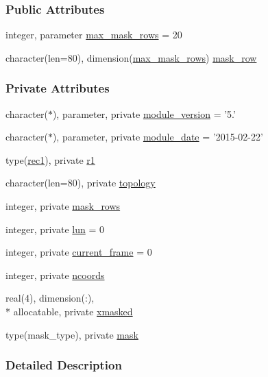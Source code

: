 \subsubsection*{Public Attributes}
\begin{DoxyCompactItemize}
\item 
integer, parameter \hyperlink{classtrj_a82dde4806006cf7789887e849dae4443}{max\-\_\-mask\-\_\-rows} = 20
\item 
character(len=80), dimension(\hyperlink{classtrj_a82dde4806006cf7789887e849dae4443}{max\-\_\-mask\-\_\-rows}) \hyperlink{classtrj_a2e5ed1fb4cc717df7c8a8cd01174d0c1}{mask\-\_\-row}
\end{DoxyCompactItemize}
\subsubsection*{Private Attributes}
\begin{DoxyCompactItemize}
\item 
character($\ast$), parameter, private \hyperlink{classtrj_a2865e4831781f2cf03f656976cdf17e0}{module\-\_\-version} = '5.'
\item 
character($\ast$), parameter, private \hyperlink{classtrj_a1ad7018116ab14c2fd3f3fde2792055d}{module\-\_\-date} = '2015-\/02-\/22'
\item 
type(\hyperlink{structtrj_1_1rec1}{rec1}), private \hyperlink{classtrj_acf470327c3f403618e7baa2a0ea78d67}{r1}
\item 
character(len=80), private \hyperlink{classtrj_a4c4bd9f146c2196f65befad1b0de347c}{topology}
\item 
integer, private \hyperlink{classtrj_a7c93922f84f1c169722dd8f2d0417f58}{mask\-\_\-rows}
\item 
integer, private \hyperlink{classtrj_a0b2ab5229b0662496be10cd030269061}{lun} = 0
\item 
integer, private \hyperlink{classtrj_a2b6c4bc77aab36d66d49c40d0eb6bfa3}{current\-\_\-frame} = 0
\item 
integer, private \hyperlink{classtrj_aff4c766e3802d44c4064fe02cc46c5c7}{ncoords}
\item 
real(4), dimension(\-:), \\*
allocatable, private \hyperlink{classtrj_a2f46430a700e35ee26d619ce6d99dfd3}{xmasked}
\item 
type(mask\-\_\-type), private \hyperlink{classtrj_ab48e8fc72f4100008d1e4eb7ca8e6101}{mask}
\end{DoxyCompactItemize}


\subsubsection{Detailed Description}


